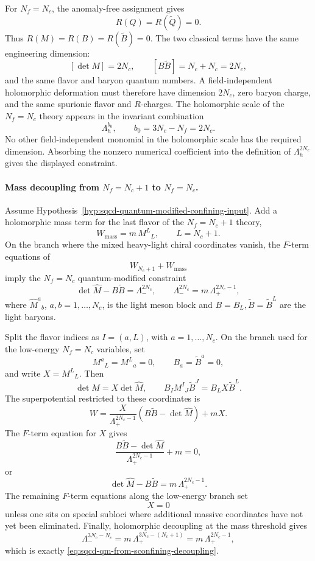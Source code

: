For \(N_f=N_c\), the anomaly-free assignment gives
\[
  R(Q)=R(\widetilde Q)=0 .
\]
Thus \(R(M)=R(B)=R(\widetilde B)=0\).  The two classical terms have the same
engineering dimension:
\[
  [\det M]=2N_c,\qquad [B\widetilde B]=N_c+N_c=2N_c,
\]
and the same flavor and baryon quantum numbers.  A field-independent
holomorphic deformation must therefore have dimension \(2N_c\), zero
baryon charge, and the same spurionic flavor and \(R\)-charges.  The
holomorphic scale of the \(N_f=N_c\) theory appears in the invariant
combination
\[
  \Lambda_h^{b_0},\qquad b_0=3N_c-N_f=2N_c .
\]
No other field-independent monomial in the holomorphic scale has the required
dimension.  Absorbing the nonzero numerical coefficient into the definition
of \(\Lambda_h^{2N_c}\) gives the displayed constraint.

\paragraph{Mass decoupling from \(N_f=N_c+1\) to \(N_f=N_c\).}
Assume Hypothesis~\ref{hyp:sqcd-quantum-modified-confining-input}.  Add a
holomorphic mass term for the last flavor of the \(N_f=N_c+1\) theory,
\[
  W_{\mathrm{mass}}=m\,M^{L}{}_{L},
  \qquad L=N_c+1 .
\]
On the branch where the mixed heavy-light chiral coordinates vanish, the
\(F\)-term equations of
\[
  W_{N_c+1}+W_{\mathrm{mass}}
\]
imply the \(N_f=N_c\) quantum-modified constraint
\begin{equation}
  \det \widehat M-B\widetilde B=\Lambda_-^{2N_c},
  \qquad
  \Lambda_-^{2N_c}=m\,\Lambda_+^{2N_c-1},
  \label{eq:sqcd-qm-from-sconfining-decoupling}
\end{equation}
where \(\widehat M^a{}_b\), \(a,b=1,\ldots,N_c\), is the light meson block
and \(B=B_L,\widetilde B=\widetilde B^L\) are the light baryons.

Split the flavor indices as \(I=(a,L)\), with \(a=1,\ldots,N_c\).  On the
branch used for the low-energy \(N_f=N_c\) variables, set
\[
  M^a{}_L=M^L{}_a=0,\qquad B_a=\widetilde B^a=0,
\]
and write \(X=M^L{}_L\).  Then
\[
  \det M=X\det\widehat M,
  \qquad
  B_I M^I{}_J\widetilde B^J=B_LX\widetilde B^L .
\]
The superpotential restricted to these coordinates is
\[
  W
  =
  \frac{X}{\Lambda_+^{2N_c-1}}
  \left(B\widetilde B-\det\widehat M\right)
  +mX .
\]
The \(F\)-term equation for \(X\) gives
\[
  \frac{B\widetilde B-\det\widehat M}{\Lambda_+^{2N_c-1}}+m=0,
\]
or
\[
  \det\widehat M-B\widetilde B=m\,\Lambda_+^{2N_c-1}.
\]
The remaining \(F\)-term equations along the low-energy branch set
\[
  X=0
\]
unless one sits on special subloci where additional massive coordinates have
not yet been eliminated.  Finally, holomorphic decoupling at the mass
threshold gives
\[
  \Lambda_-^{3N_c-N_c}
  =
  m\,\Lambda_+^{3N_c-(N_c+1)}
  =
  m\,\Lambda_+^{2N_c-1},
\]
which is exactly \eqref{eq:sqcd-qm-from-sconfining-decoupling}.

